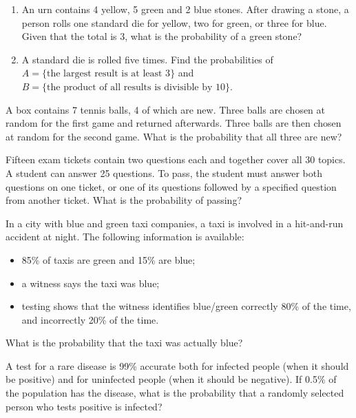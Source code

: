 \documentclass[a4paper]{report}
\begin{document}
\begin{problempencil}[T1, SE 2023]
\begin{enumerate}
\item An urn contains 4 yellow, 5 green and 2 blue stones. After drawing a stone, a person rolls one standard die for yellow, two for green, or three for blue. Given that the total is 3, what is the probability of a green stone?
\item A standard die is rolled five times. Find the probabilities of $A=\{\text{the largest result is at least 3}\}$ and $B=\{\text{the product of all results is divisible by 10}\}$.
\end{enumerate}
\end{problempencil}
\begin{problem}
A box contains 7 tennis balls, 4 of which are new. Three balls are chosen at random for the first game and returned afterwards. Three balls are then chosen at random for the second game. What is the probability that all three are new?
\end{problem}
\begin{problem}
Fifteen exam tickets contain two questions each and together cover all 30 topics. A student can answer 25 questions. To pass, the student must answer both questions on one ticket, or one of its questions followed by a specified question from another ticket. What is the probability of passing?
\end{problem}
\begin{probleminteresting}
In a city with blue and green taxi companies, a taxi is involved in a hit-and-run accident at night. The following information is available:
\begin{itemize}
\item 85\% of taxis are green and 15\% are blue;
\item a witness says the taxi was blue;
\item testing shows that the witness identifies blue/green correctly 80\% of the time, and incorrectly 20\% of the time.
\end{itemize}
What is the probability that the taxi was actually blue?
\end{probleminteresting}
\begin{problembook}
A test for a rare disease is 99\% accurate both for infected people (when it should be positive) and for uninfected people (when it should be negative). If 0.5\% of the population has the disease, what is the probability that a randomly selected person who tests positive is infected?
\end{problembook}
\end{document}
